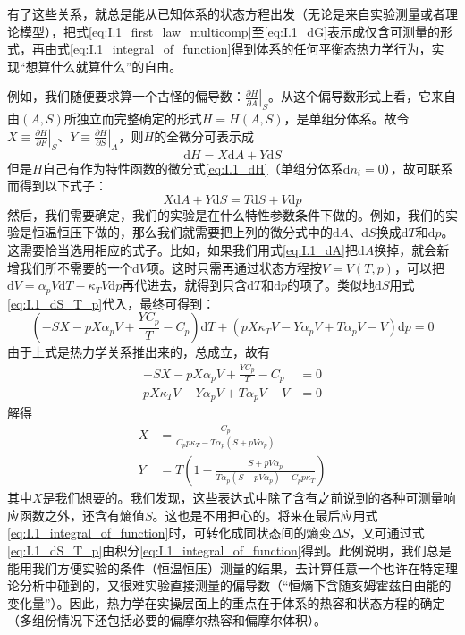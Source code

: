 \documentclass[main.tex]{subfiles}
\begin{document}
有了这些关系，就总是能从已知体系的状态方程出发（无论是来自实验测量或者理论模型），把式\eqref{eq:I.1_first_law_multicomp}至\eqref{eq:I.1_dG}表示成仅含可测量的形式，再由式\eqref{eq:I.1_integral_of_function}得到体系的任何平衡态热力学行为，实现“想算什么就算什么”的自由。

例如，我们随便要求算一个古怪的偏导数：$\left.\frac{\partial H}{\partial A}\right|_{S}$。从这个偏导数形式上看，它来自由$\left(A,S\right)$所独立而完整确定的形式$H=H\left(A,S\right)$，是单组分体系。故令$X\equiv\left.\frac{\partial H}{\partial F}\right|_{S}$、$Y\equiv\left.\frac{\partial H}{\partial S}\right|_{A}$，则$H$的全微分可表示成
\[\mathrm{d}H=X\mathrm{d}A+Y\mathrm{d}S\]
但是$H$自己有作为特性函数的微分式\eqref{eq:I.1_dH}（单组分体系$\mathrm{d}n_i=0$），故可联系而得到以下式子：
\[X\mathrm{d}A+Y\mathrm{d}S=T\mathrm{d}S+V\mathrm{d}p\]
然后，我们需要确定，我们的实验是在什么特性参数条件下做的。例如，我们的实验是恒温恒压下做的，那么我们就需要把上列的微分式中的$\mathrm{d}A$、$\mathrm{d}S$换成$\mathrm{d}T$和$\mathrm{d}p$。这需要恰当选用相应的式子。比如，如果我们用式\eqref{eq:I.1_dA}把$\mathrm{d}A$换掉，就会新增我们所不需要的一个$\mathrm{d}V$项。这时只需再通过状态方程按$V=V\left(T,p\right)$，可以把$\mathrm{d}V=\alpha_pV\mathrm{d}T-\kappa_TV\mathrm{d}p$再代进去，就得到只含$\mathrm{d}T$和$\mathrm{d}p$的项了。类似地$\mathrm{d}S$用式\eqref{eq:I.1_dS_T_p}代入，最终可得到：
\[\left(-SX-pX\alpha_pV+\frac{YC_p}{T}-C_p\right)\mathrm{d}T+\left(pX\kappa_TV-Y\alpha_pV+T\alpha_pV-V\right)\mathrm{d}p=0\]
由于上式是热力学关系推出来的，总成立，故有
\begin{align*}
    -SX-pX\alpha_pV+\frac{YC_p}{T}-C_p  & =0 \\
    pX\kappa_TV-Y\alpha_pV+T\alpha_pV-V & =0
\end{align*}
解得
\begin{align*}
    X & =\frac{C_p}{C_p p \kappa_T-T\alpha_p\left(S+pV\alpha_p\right)}                          \\
    Y & =T\left(1-\frac{S+p V \alpha_p}{T\alpha_p\left(S+pV\alpha_p\right)-C_pp\kappa_T}\right)
\end{align*}
其中$X$是我们想要的。我们发现，这些表达式中除了含有之前说到的各种可测量响应函数之外，还含有熵值$S$。这也是不用担心的。将来在最后应用式\eqref{eq:I.1_integral_of_function}时，可转化成同状态间的熵变$\Delta S$，又可通过式\eqref{eq:I.1_dS_T_p}由积分\eqref{eq:I.1_integral_of_function}得到。此例说明，我们总是能用我们方便实验的条件（恒温恒压）测量的结果，去计算任意一个也许在特定理论分析中碰到的，又很难实验直接测量的偏导数（“恒熵下含随亥姆霍兹自由能的变化量”）。因此，热力学在实操层面上的重点在于体系的热容和状态方程的确定（多组份情况下还包括必要的偏摩尔热容和偏摩尔体积）。
\end{document}
